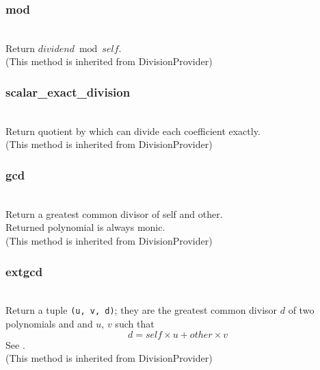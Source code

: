   \subsubsection{mod}
  \\
  \spacing
  \quad Return \(dividend \bmod self\).\\
  (This method is inherited from DivisionProvider)

  \subsubsection{scalar\_exact\_division}
  \\
  \spacing
  \quad Return quotient by  which can divide each
  coefficient exactly.\\
  (This method is inherited from DivisionProvider)

  \subsubsection{gcd}
  \\
  \spacing
  \quad Return a greatest common divisor of self and other.\\
  \spacing
  \quad Returned polynomial is always monic.\\
  (This method is inherited from DivisionProvider)

  \subsubsection{extgcd}
  \\
  \spacing
  \quad Return a tuple {\tt (u, v, d)}; they are the greatest common
  divisor \(d\) of two polynomials  and  and
  \(u\), \(v\) such that
  \[ d = self \times u + other \times v\]
  \spacing
  See .\\
  (This method is inherited from DivisionProvider)

